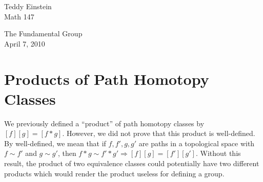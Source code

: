 \documentclass[reqno]{amsart}
\begin{document}
\noindent Teddy Einstein\\Math 147\\
\begin{center}
The Fundamental Group\\
April 7, 2010 \\
\end{center}
\renewcommand{\labelenumi}{\roman{enumi}.}

\medskip

\section{Products of Path Homotopy Classes}

We previously defined a ``product'' of path homotopy classes by $[f][g] = [f*g]$. However, we did not prove that this product is well-defined. 
By well-defined, we mean that if $f,f',g,g'$ are paths in a topological space with $f\sim f'$ and $g\sim g'$, then $f*g\sim f'*g' \Rightarrow [f][g] = [f'][g']$.
Without this result, the product of two equivalence classes could potentially have two different products which would render the product useless for defining a group. 
\end{document}
